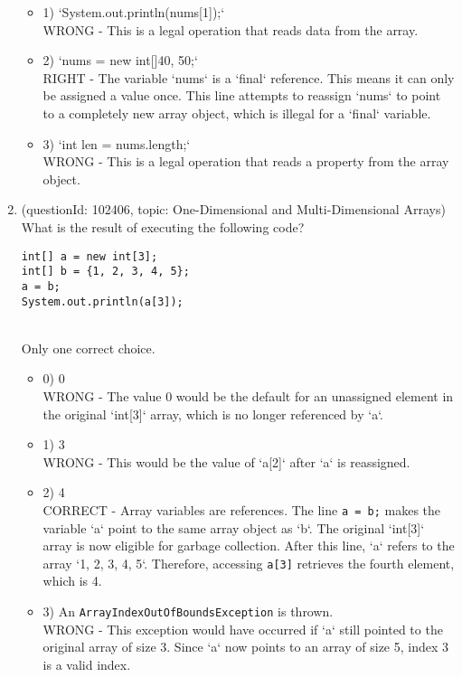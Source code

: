 \documentclass[12pt]{article}
\begin{document}
\begin{enumerate}[label=(\arabic*)]
\begin{itemize}
\item 1) `System.out.println(nums[1]);`
 \\ 
WRONG - This is a legal operation that reads data from the array.

\item 2) `nums = new int[]{40, 50};`
 \\ 
RIGHT - The variable `nums` is a `final` reference. This means it can only be assigned a value once. This line attempts to reassign `nums` to point to a completely new array object, which is illegal for a `final` variable.

\item 3) `int len = nums.length;`
 \\ 
WRONG - This is a legal operation that reads a property from the array object.

\end{itemize}
\item (questionId: 102406, topic: One-Dimensional and Multi-Dimensional Arrays) \\ 
What is the result of executing the following code?\begin{verbatim}
int[] a = new int[3];
int[] b = {1, 2, 3, 4, 5};
a = b;
System.out.println(a[3]);
\end{verbatim}
\\ \noindent Only one correct choice. 
\begin{itemize}
\item 0) 0
 \\ 
WRONG - The value 0 would be the default for an unassigned element in the original `int[3]` array, which is no longer referenced by `a`.

\item 1) 3
 \\ 
WRONG - This would be the value of `a[2]` after `a` is reassigned.

\item 2) 4
 \\ 
CORRECT - Array variables are references. The line \verb|a = b;| makes the variable `a` point to the same array object as `b`. The original `int[3]` array is now eligible for garbage collection. After this line, `a` refers to the array `{1, 2, 3, 4, 5}`. Therefore, accessing \verb|a[3]| retrieves the fourth element, which is 4.

\item 3) An \verb|ArrayIndexOutOfBoundsException| is thrown.
 \\ 
WRONG - This exception would have occurred if `a` still pointed to the original array of size 3. Since `a` now points to an array of size 5, index 3 is a valid index.


\end{itemize}
\end{enumerate}
\end{document}
